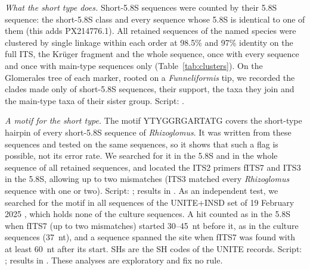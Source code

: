 \documentclass[11pt]{article}
\newcommand{\spn}[1]{\emph{#1}}   %
\begin{document}
\emph{What the short type does.} Short-5.8S sequences were counted by their 5.8S sequence: the short-5.8S class and
every sequence whose 5.8S is identical to one of them (this adds PX214776.1). All retained sequences of the named
species were clustered by single linkage within each order at 98.5\% and 97\% identity on the full ITS, the Kr\"uger
fragment and the whole sequence, once with every sequence and once with main-type sequences only
(Table~\ref{tab:clusters}). On the Glomerales tree of each marker, rooted on a \spn{Funneliformis} tip, we recorded the
clades made only of short-5.8S sequences, their support, the taxa they join and the main-type taxa of their sister
group. Script: .

\emph{A motif for the short type.} The motif YTYGGRGARTATG covers the short-type hairpin of every short-5.8S sequence
of \spn{Rhizoglomus}. It was written from these sequences and tested on the same sequences, so it shows that such a
flag is possible, not its error rate. We searched for it in the 5.8S and in the whole sequence of all \MotifCopies{}
retained sequences, and located the ITS2 primers fITS7 \cite{ihrmark2012new} and ITS3 \cite{white1990amplification} in
the 5.8S, allowing up to two mismatches (ITS3 matched every \spn{Rhizoglomus} sequence with one or two). Script:
; results in . As an independent test, we
searched for the motif in all \UniteSeqs{} sequences of the UNITE+INSD set of 19 February 2025
\cite{unite2025release}, which holds none of the culture sequences. A hit counted as in the 5.8S when fITS7 (up to two
mismatches) started 30--45~nt before it, as in the culture sequences (37~nt), and a sequence spanned the site when
fITS7 was found with at least 60~nt after its start. SHs are the SH codes of the UNITE records. Script:
; results in . These analyses are
exploratory and fix no rule.

\clearpage



\clearpage %




\end{document}
